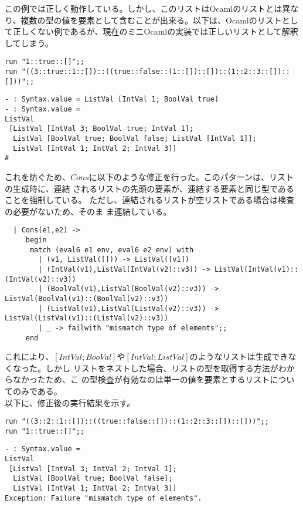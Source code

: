 \documentclass[a4paper,9pt]{jsarticle}
\begin{document}
この例では正しく動作している。しかし、このリストはOcamlのリストとは異な
り、複数の型の値を要素として含むことが出来る。以下は、Ocamlのリストとし
て正しくない例であるが、現在のミニOcamlの実装では正しいリストとして解釈
してしまう。

\begin{lstlisting}
run "1::true::[]";;
run "((3::true::1::[])::((true::false::(1::[])::[])::(1::2::3::[])::[]))";;
\end{lstlisting}
\begin{lstlisting}
- : Syntax.value = ListVal [IntVal 1; BoolVal true]
- : Syntax.value =
ListVal
 [ListVal [IntVal 3; BoolVal true; IntVal 1];
  ListVal [BoolVal true; BoolVal false; ListVal [IntVal 1]];
  ListVal [IntVal 1; IntVal 2; IntVal 3]]
# 
\end{lstlisting}

これを防ぐため、$Cons$に以下のような修正を行った。このパターンは、リストの生成時に、連結
されるリストの先頭の要素が、連結する要素と同じ型であることを強制している。
ただし、連結されるリストが空リストである場合は検査の必要がないため、そのま
ま連結している。

\begin{lstlisting}
  | Cons(e1,e2) ->
     begin
      match (eval6 e1 env, eval6 e2 env) with
        | (v1, ListVal([])) -> ListVal([v1])
        | (IntVal(v1),ListVal(IntVal(v2)::v3)) -> ListVal(IntVal(v1)::(IntVal(v2)::v3))
        | (BoolVal(v1),ListVal(BoolVal(v2)::v3)) -> ListVal(BoolVal(v1)::(BoolVal(v2)::v3))
        | (ListVal(v1),ListVal(ListVal(v2)::v3)) -> ListVal(ListVal(v1)::(ListVal(v2)::v3))
        | _ -> failwith "mismatch type of elements";;
     end
\end{lstlisting}
これにより、$[IntVal;BooVal]$や$[IntVal;ListVal]$のようなリストは生成できなくなった。しかし
リストをネストした場合、リストの型を取得する方法がわからなかったため、こ
の型検査が有効なのは単一の値を要素とするリストについてのみである。\\

以下に、修正後の実行結果を示す。

\begin{lstlisting}
run "((3::2::1::[])::((true::false::[])::(1::2::3::[])::[]))";;
run "1::true::[]";;
\end{lstlisting}

\begin{lstlisting}
- : Syntax.value =
ListVal
 [ListVal [IntVal 3; IntVal 2; IntVal 1];
  ListVal [BoolVal true; BoolVal false];
  ListVal [IntVal 1; IntVal 2; IntVal 3]]
Exception: Failure "mismatch type of elements".
\end{lstlisting}
\end{document}
